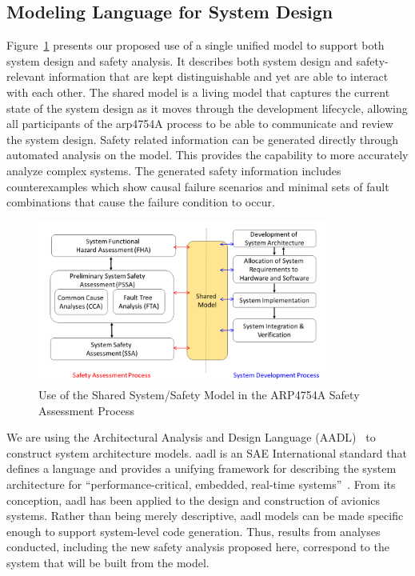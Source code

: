 \subsection{Modeling Language for System Design}
\label{subsec:aadl-agree}
Figure~\ref{fig:proposed_safety_process} presents our proposed use of a single unified model to support both system design and safety analysis. It describes both system design and safety-relevant information 
that are kept distinguishable and yet are able to interact with each other. The shared model is a living model that captures the current state of the system design as it moves through the development lifecycle, allowing all participants of the \gls{arp}4754A process to be able to communicate and review the system design. Safety related information can be generated directly through automated analysis on the model. This provides the capability to more accurately analyze complex systems. The generated safety information includes counterexamples which show causal failure scenarios and minimal sets of fault combinations that cause the failure condition to occur.

\begin{figure}[t!]
	
	\centering
	\includegraphics[trim=0 5 0 5,clip,width=0.85\textwidth]{images/process3.png}
	
	\caption{Use of the Shared System/Safety Model in the ARP4754A Safety Assessment Process}
	\label{fig:proposed_safety_process}
\end{figure}

We are using the Architectural Analysis and Design Language (AADL)~\cite{FeilerModelBasedEngineering2012} to construct system architecture models.  \gls{aadl} is an SAE International standard that defines a language and provides a unifying framework for describing the system architecture for ``performance-critical, embedded, real-time systems''~\cite{AADL_Standard}. From its conception, \gls{aadl} has been applied to the design and construction of avionics systems.  
Rather than being merely descriptive, \gls{aadl} models can be made specific enough to support system-level code generation.  Thus, results from analyses conducted, including the new safety analysis proposed here, correspond to the system that will be built from the model.  

